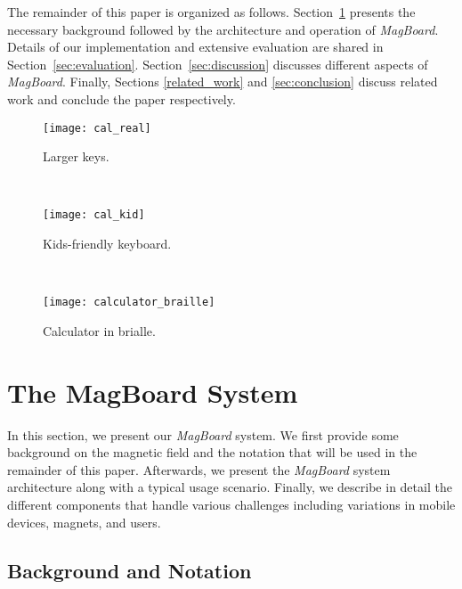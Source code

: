 \documentclass[conference]{IEEEtran}
\def \sys {\textit{MagBoard}}
\def \asys {MagBoard}
\begin{document}
The remainder of this paper is organized as follows. Section~\ref{sec:system} presents the necessary background followed by the architecture and operation of \sys{}. Details of our implementation and extensive evaluation are shared in Section~\ref{sec:evaluation}. Section~\ref{sec:discussion} discusses different aspects of \sys{}. Finally, Sections \ref{related_work} and \ref{sec:conclusion} discuss related work and conclude the paper respectively.

\begin{figure*}[!t]
\centering
        \begin{subfigure}[t]{0.3\textwidth}
                \centering
                \texttt{[image: cal\_real]}
                \caption{Larger keys.}
	      \label{fig:calc_app_intro}
        \end{subfigure}~~~~~~
        \begin{subfigure}[t]{0.3\textwidth}
                \centering
 	      \texttt{[image: cal\_kid]}
               \caption{Kids-friendly keyboard.}
               \label{fig:calc_app_intro_kids}
        \end{subfigure}~~~~~~
        \begin{subfigure}[b]{0.3\textwidth}
	\texttt{[image: calculator\_braille]}
	\caption{Calculator in brialle.}
	\label{fig:calculator_brialle}
	\end{subfigure}
\caption{Using \sys{} with a sample calculator application. Different physical keyboards can be used with the same application (homomorphism) to meet different users' needs.}
\label{fig:real_kids_calculator}
\end{figure*}

\section{The \asys{} System}
\label{sec:system}

In this section, we present our \sys{} system. We first provide some background on the magnetic field and the notation that will be used in the remainder of this paper. Afterwards, we present the \sys{} system architecture along with a typical usage scenario. Finally, we describe in detail the different components that handle various challenges including variations in mobile devices, magnets, and users.

\subsection{Background and Notation}
\end{document}
